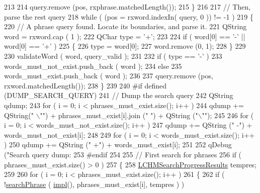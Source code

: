 \begin{DoxyCode}
213         
214         query.remove (pos, rxphrase.matchedLength());
215     \}
216 
217     \textcolor{comment}{// Then, parse the rest query}
218     \textcolor{keywordflow}{while} ( (pos = rxword.indexIn( query, 0 )) != -1 )
219     \{
220         \textcolor{comment}{// A phrase query found. Locate its boundaries, and parse it.}
221         QString word = rxword.cap ( 1 );
222         QChar type = \textcolor{charliteral}{'+'};
223         
224         \textcolor{keywordflow}{if} ( word[0] == \textcolor{charliteral}{'-'} || word[0] == \textcolor{charliteral}{'+'} )
225         \{
226             type = word[0];
227             word.remove (0, 1);
228         \}
229         
230         validateWord ( word, query\_valid );
231                 
232         \textcolor{keywordflow}{if} ( type == \textcolor{charliteral}{'-'} )
233             words\_must\_not\_exist.push\_back ( word );
234         \textcolor{keywordflow}{else}
235             words\_must\_exist.push\_back ( word );
236         
237         query.remove (pos, rxword.matchedLength());
238     \}
239 
240 \textcolor{preprocessor}{#if defined (DUMP\_SEARCH\_QUERY)}
241     \textcolor{comment}{// Dump the search query}
242     QString qdump;
243     \textcolor{keywordflow}{for} ( i = 0; i < phrases\_must\_exist.size(); i++ )
244         qdump += QString(\textcolor{stringliteral}{" \(\backslash\)""}) + phrases\_must\_exist[i].join (\textcolor{stringliteral}{" "}) + QString (\textcolor{stringliteral}{"\(\backslash\)""});
245 
246     \textcolor{keywordflow}{for} ( i = 0; i < words\_must\_not\_exist.size(); i++ )
247         qdump += QString (\textcolor{stringliteral}{" -"}) + words\_must\_not\_exist[i];
248     
249     \textcolor{keywordflow}{for} ( i = 0; i < words\_must\_exist.size(); i++ )
250         qdump += QString (\textcolor{stringliteral}{" +"}) + words\_must\_exist[i];
251 
252     qDebug (\textcolor{stringliteral}{"Search query dump: %
253 \textcolor{preprocessor}{#endif}
254 
255     \textcolor{comment}{// First search for phrases}
256     \textcolor{keywordflow}{if} ( phrases\_must\_exist.size() > 0 )
257     \{
258         \hyperlink{libchmfileimpl_8h_a49915bbafbeae4acb86601a1e4f0c247}{LCHMSearchProgressResults} tempres;
259         
260         \textcolor{keywordflow}{for} ( i = 0; i < phrases\_must\_exist.size(); i++ )
261         \{
262             \textcolor{keywordflow}{if} ( !\hyperlink{libchmfile__search_8cpp_a17cc37a7460f0c55fa27f233e21f4f94}{searchPhrase} ( \hyperlink{classLCHMFile_a74fa35f014782712fd33f53cb2247cc2}{impl}(), phrases\_must\_exist[i], tempres ) )
}
\end{DoxyCode}
